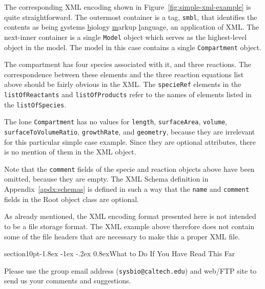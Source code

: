 \documentclass[10pt]{article}
\makeatletter
\renewcommand{\section}{\@startsection%
  {section}{1}{0pt}{-1.8ex \@plus -1ex \@minus -.2ex}%
  {0.8ex}{\normalfont\Large\bfseries}}
\newcommand{\class}[1]{\textsf{#1}}
\makeatother
\begin{document}
The corresponding XML encoding shown in Figure~\ref{fig:simple-xml-example}
is quite straightforward.  The outermost container is a tag, \texttt{smbl},
that identifies the contents as being \underline{s}ystems \underline{b}iology
\underline{m}arkup \underline{l}anguage, an application of XML.  The next-inner
container is a single \texttt{Model} object which serves as the
highest-level object in the model.  The model in this case contains a
single \texttt{Compartment} object.

The compartment has four species associated with it, and three reactions.
The correspondence between these elements and the three reaction equations
list above should be fairly obvious in the XML.  The \texttt{specieRef}
elements in the \texttt{listOfReactants} and \texttt{listOfProducts} refer
to the names of elements listed in the \texttt{listOfSpecies}.

The lone \texttt{Compartment} has no values for \texttt{length},
\texttt{surfaceArea}, \texttt{volume}, \texttt{surfaceToVolumeRatio},
\texttt{growthRate}, and \texttt{geometry}, because they are irrelevant for
this particular simple case example.  Since they are optional attributes,
there is no mention of them in the XML object.

Note that the \texttt{comment} fields of the specie and reaction objects
above have been omitted, because they are empty.  The XML Schema definition
in Appendix~\ref{apdx:schemas} is defined in such a way that the
\texttt{name} and \texttt{comment} fields in the \class{Root} object class
are optional.

As already mentioned, the XML encoding format presented here is not
intended to be a file storage format.  The XML example above therefore does
not contain some of the file headers that are necessary to make this a
proper XML file.


\section{What to Do If You Have Read This Far}
\label{sec:what}

Please use the group email address (\texttt{sysbio@caltech.edu}) and
web/FTP site to send us your comments and suggestions.


\appendix

\end{document}
